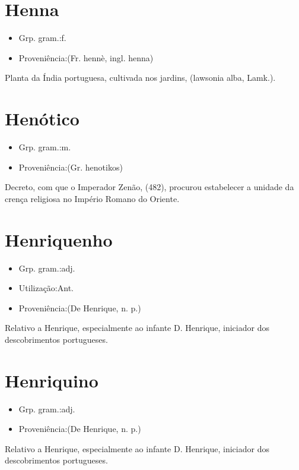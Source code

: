 \documentclass{article}
\begin{document}
\section{Henna}
\begin{itemize}
\item {Grp. gram.:f.}
\end{itemize}
\begin{itemize}
\item {Proveniência:(Fr. \textunderscore hennè\textunderscore , ingl. \textunderscore henna\textunderscore )}
\end{itemize}
Planta da Índia portuguesa, cultivada nos jardins, (\textunderscore lawsonia alba\textunderscore , Lamk.).
\section{Henótico}
\begin{itemize}
\item {Grp. gram.:m.}
\end{itemize}
\begin{itemize}
\item {Proveniência:(Gr. \textunderscore henotikos\textunderscore )}
\end{itemize}
Decreto, com que o Imperador Zenão, (482), procurou estabelecer a unidade da crença religiosa no Império Romano do Oriente.
\section{Henriquenho}
\begin{itemize}
\item {Grp. gram.:adj.}
\end{itemize}
\begin{itemize}
\item {Utilização:Ant.}
\end{itemize}
\begin{itemize}
\item {Proveniência:(De \textunderscore Henrique\textunderscore , n. p.)}
\end{itemize}
Relativo a Henrique, especialmente ao infante D. Henrique, iniciador dos descobrimentos portugueses.
\section{Henriquino}
\begin{itemize}
\item {Grp. gram.:adj.}
\end{itemize}
\begin{itemize}
\item {Proveniência:(De \textunderscore Henrique\textunderscore , n. p.)}
\end{itemize}
Relativo a Henrique, especialmente ao infante D. Henrique, iniciador dos descobrimentos portugueses.
\end{document}
